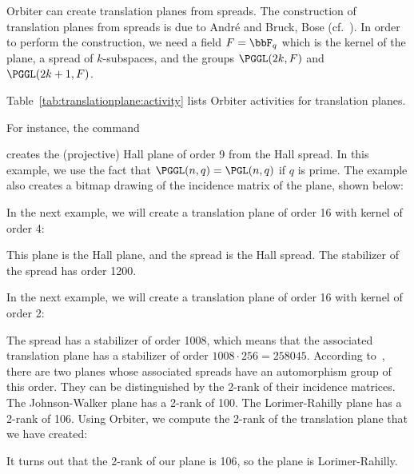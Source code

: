 

Orbiter can create translation planes from spreads. 
The construction of translation planes from spreads 
is due to Andr\'e and Bruck, Bose (cf.~\cite{Andre54,BruckBose64}). 
In order to perform the construction, we need a field $F=\bbF_q$ 
which is the kernel of the plane, 
a spread of $k$-subspaces, 
and the groups $\PGGL(2k,F)$ and $\PGGL(2k+1,F)$.

\bigskip

Table~\ref{tab:translationplane:activity} lists Orbiter activities for translation planes.


For instance, the command 


creates the (projective) Hall plane of order 9 from the Hall spread.
In this example, we use the fact that $\PGGL(n,q) = \PGL(n,q)$ if $q$ is prime.
The example also creates a bitmap drawing of the incidence matrix of the plane, 
shown below:

\bigskip

In the next example, we will create a translation plane 
of order 16 with kernel of order 4:


This plane is the Hall plane, and the spread is the Hall spread. 
The stabilizer of the spread has order 1200.

\bigskip

In the next example, we will create 
a translation plane of order 16 with kernel of order 2:


The spread has a stabilizer of order 1008, 
which means that the associated translation plane 
has a stabilizer of order $1008 \cdot 256 = 258045.$
According to~\cite{Moorhouse:tables:16}, there are two planes 
whose associated spreads have an automorphism group of this order. 
They can be distinguished by the 2-rank of their incidence matrices. 
The Johnson-Walker plane has a 2-rank of 100. 
The Lorimer-Rahilly plane has a 2-rank of 106. 
Using Orbiter, we compute the 2-rank of the translation plane that we have created:


It turns out that the 2-rank of our plane is 106, so the plane is Lorimer-Rahilly.


